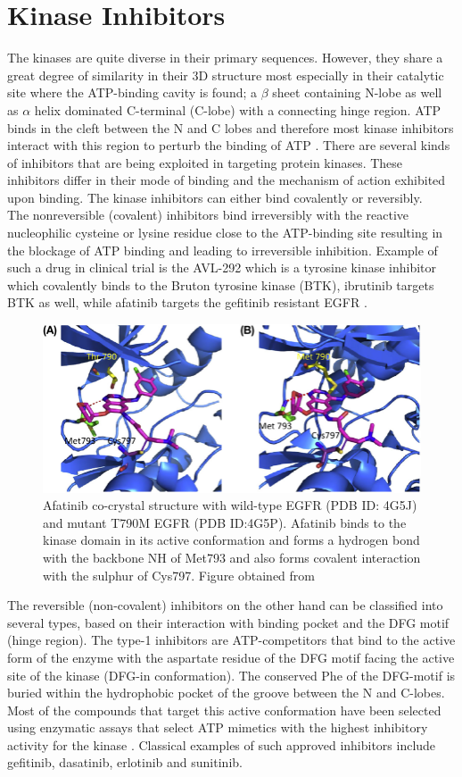 \documentclass[a4paper, 11pt]{article}
\begin{document}
\section*{Kinase Inhibitors}
The kinases are quite diverse in their primary sequences. However, they share a great degree of similarity in their 3D structure most especially in their catalytic site where the ATP-binding cavity is found; a $\beta$ sheet containing N-lobe as well as $\alpha$ helix dominated C-terminal (C-lobe) with a connecting hinge region. ATP binds in the cleft between the N and C lobes and therefore most kinase inhibitors interact with this region to perturb the binding of ATP \cite{wu2015fda}. There are several kinds of inhibitors that are being exploited in targeting protein kinases. These inhibitors differ in their mode of binding and the mechanism of action exhibited upon binding. The kinase inhibitors can either bind covalently or reversibly.\\
The nonreversible (covalent) inhibitors bind irreversibly with the reactive nucleophilic cysteine or lysine residue close to the ATP-binding site resulting in the blockage of ATP binding and leading to irreversible inhibition. Example of such a drug in clinical trial is the AVL-292 which is a tyrosine kinase inhibitor which covalently binds to the Bruton tyrosine kinase (BTK)\cite{robak2012tyrosine}, ibrutinib targets BTK as well, while afatinib targets the gefitinib resistant EGFR \cite{akinleye2014ibrutinib}.\\
\begin{figure}[H]
	\includegraphics[width=.8\linewidth]{figures/Afatinib.jpg}
	\centering
	\caption{Afatinib co-crystal structure with wild-type EGFR (PDB ID: 4G5J) and mutant T790M EGFR (PDB ID:4G5P). Afatinib binds to the kinase domain in its active conformation and forms a hydrogen bond with the backbone NH of Met793 and also forms covalent interaction with the sulphur of Cys797. Figure obtained from \cite{hossam2016covalent}}
	\label{afatinib}
\end{figure}
The reversible (non-covalent) inhibitors on the other hand can be classified into several types, based on their interaction with binding pocket and the DFG motif (hinge region). The type-1 inhibitors are ATP-competitors that bind to the active form of the enzyme with the aspartate residue of the DFG motif facing the active site of the kinase (DFG-in conformation). The conserved Phe of the DFG-motif is buried within the hydrophobic pocket of the groove between the N and C-lobes. Most of the compounds that target this active conformation have been selected using enzymatic assays that select ATP mimetics with the highest inhibitory activity for the kinase \cite{fabbro2015ten}. Classical examples of such approved inhibitors include gefitinib, dasatinib, erlotinib and sunitinib.\\ 
\end{document}
